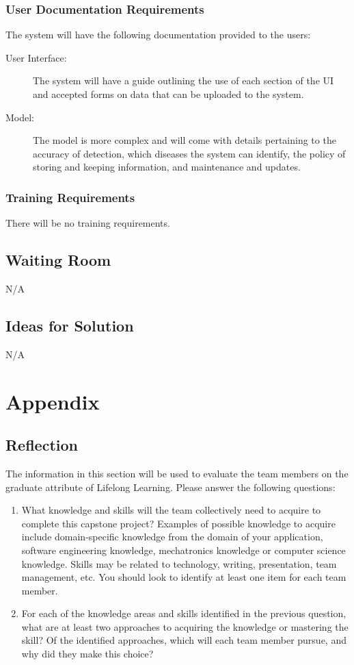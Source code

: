\documentclass[12pt]{article}
\begin{document}
\subsubsection{User Documentation Requirements}
The system will have the following documentation provided to the users:
\begin{description}
    \item[User Interface:] The system will have a guide outlining the use of each section of the UI and accepted forms on data that can be uploaded to the system.  
    \item[Model:] The model is more complex and will come with details pertaining to the accuracy of detection, which diseases the system can identify, the policy of storing and keeping information, and maintenance and updates.
\end{description}


\subsubsection{Training Requirements}
There will be no training requirements.


\subsection{Waiting Room}
N/A

\subsection{Ideas for Solution}
N/A




\newpage{}
\section{Appendix}

\subsection{Reflection}
The information in this section will be used to evaluate the team members on the
graduate attribute of Lifelong Learning.  Please answer the following questions:

\begin{enumerate}
  \item What knowledge and skills will the team collectively need to acquire to
  complete this capstone project?  Examples of possible knowledge
  to acquire include domain-specific knowledge from the domain of your
  application, software engineering knowledge, mechatronics knowledge or
  computer science knowledge.  Skills may be related to technology, writing,
  presentation, team management, etc.  You should look to identify at
  least one item for each team member.
  \item For each of the knowledge areas and skills identified in the previous
  question, what are at least two approaches to acquiring the knowledge or
  mastering the skill?  Of the identified approaches, which will each team
  member pursue, and why did they make this choice?
\end{enumerate}
\end{document}
